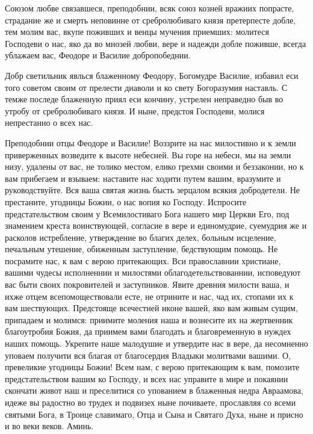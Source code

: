 Союзом любве связавшеся, преподобнии, всяк союз козней вражиих попрасте, страдание же и смерть неповинне от сребролюбиваго князя претерпесте добле, тем молим вас, вкупе поживших и венцы мучения приемших: молитеся Господеви о нас, яко да во мнозей любви, вере и надежди добле поживше, всегда ублажаем вас, Феодоре и Василие добропобеднии.




Добр светильник явлься блаженному Феодору, Богомудре Василие, избавил еси того советом своим от прелести диаволи и ко свету Богоразумия наставль. С темже последе блаженную приял еси кончину, устрелен неправедно быв во утробу от сребролюбиваго князя. И ныне, предстоя Господеви, молися непрестанно о всех нас.




Преподобнии отцы Феодоре и Василие! Воззрите на нас милостивно и к земли приверженных возведите к высоте небесней. Вы горе на небеси, мы на земли низу, удалены от вас, не толико местом, елико грехми своими и беззаконии, но к вам прибегаем и взываем: наставите нас ходити путем вашим, вразумите и руководствуйте. Вся ваша святая жизнь бысть зерцалом всякия добродетели. Не престаните, угодницы Божии, о нас вопия ко Господу. Испросите предстательством своим у Всемилостиваго Бога нашего мир Церкви Его, под знамением креста воинствующей, согласие в вере и единомудрие, суемудрия же и расколов истребление, утверждение во благих делех, больным исцеление, печальным утешение, обиженным заступление, бедствующим помощь. Не посрамите нас, к вам с верою притекающих. Вси православнии христиане, вашими чудесы исполненнии и милостями облагодетельствованнии, исповедуют вас быти своих покровителей и заступников. Явите древния милости ваша, и ихже отцем всепомоществовали есте, не отрините и нас, чад их, стопами их к вам шествующих. Предстояще всечестней иконе вашей, яко вам живым сущим, припадаем и молимся: приимите моления наша и вознесите их на жертвенник благоутробия Божия, да приимем вами благодать и благовременную в нуждех наших помощь. Укрепите наше малодушие и утвердите нас в вере, да несомненно уповаем получити вся благая от благосердия Владыки молитвами вашими. О, превеликие угодницы Божии! Всем нам, с верою притекающим к вам, помозите предстательством вашим ко Господу, и всех нас управите в мире и покаянии скончати живот наш и преселитися со упованием в блаженныя недра Авраамова, идеже вы радостно во трудех и подвизех ныне почиваете, прославляя со всеми святыми Бога, в Троице славимаго, Отца и Сына и Святаго Духа, ныне и присно и во веки веков. Аминь.
\mychapterending

